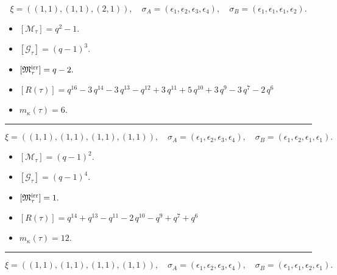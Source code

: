 \documentclass[10pt,a4paper]{amsart}
\begin{document}
$$\xi = ({(1, 1), (1, 1)}, {(2, 1)}),\quad \sigma_A = ({{\epsilon_1}, {\epsilon_2}}, {{\epsilon_3, \epsilon_4}}),\quad \sigma_B = ({{\epsilon_1}, {\epsilon_1}}, {{\epsilon_1, \epsilon_2}}).$$

\begin{itemize}
 \item $[\mathcal{M}_{\tau}] = q^{2} - 1 .$

 \item $[\mathcal{G}_{\tau}] = {\left(q - 1\right)}^{3} .$

 \item $[{\frak M}_{\tau}^{\textrm{irr}}] = q - 2 .$

 \item $[R(\tau)] = q^{16} - 3 \, q^{14} - 3 \, q^{13} - q^{12} + 3 \, q^{11} + 5 \, q^{10} + 3 \, q^{9} - 3 \, q^{7} - 2 \, q^{6} $

 \item $m_{\kappa}(\tau) = 6 .$

 \end{itemize}
\noindent\rule{8cm}{0.4pt}

$$\xi = ({(1, 1), (1, 1)}, {(1, 1), (1, 1)}),\quad \sigma_A = ({{\epsilon_1}, {\epsilon_2}}, {{\epsilon_3}, {\epsilon_4}}),\quad \sigma_B = ({{\epsilon_1}, {\epsilon_2}}, {{\epsilon_1}, {\epsilon_1}}).$$

\begin{itemize}
 \item $[\mathcal{M}_{\tau}] = {\left(q - 1\right)}^{2} .$

 \item $[\mathcal{G}_{\tau}] = {\left(q - 1\right)}^{4} .$

 \item $[{\frak M}_{\tau}^{\textrm{irr}}] = 1 .$

 \item $[R(\tau)] = q^{14} + q^{13} - q^{11} - 2 \, q^{10} - q^{9} + q^{7} + q^{6} $

 \item $m_{\kappa}(\tau) = 12 .$

 \end{itemize}
\noindent\rule{8cm}{0.4pt}

$$\xi = ({(1, 1), (1, 1)}, {(1, 1)}, {(1, 1)}),\quad \sigma_A = ({{\epsilon_1}, {\epsilon_2}}, {{\epsilon_3}}, {{\epsilon_4}}),\quad \sigma_B = ({{\epsilon_1}, {\epsilon_1}}, {{\epsilon_2}}, {{\epsilon_1}}).$$
\end{document}
